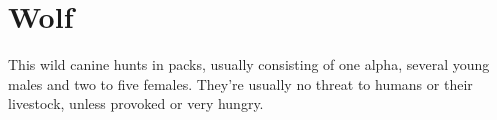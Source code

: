 \section{Wolf}

This wild canine hunts in packs, usually consisting of one alpha, several young males and two to five females. They're usually no threat to humans or their livestock, unless provoked or very hungry.